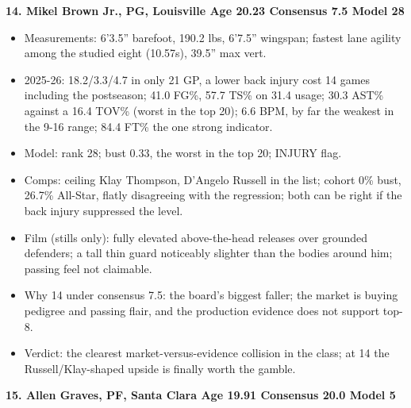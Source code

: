 \documentclass[
  10pt,
]{article}
\providecommand{\tightlist}{%
  \setlength{\itemsep}{0pt}\setlength{\parskip}{0pt}}
\begin{document}
\textbf{14. Mikel Brown Jr., PG, Louisville \textbar{} Age 20.23 \textbar{}
Consensus 7.5 \textbar{} Model 28}

\begin{itemize}
\tightlist
\item
  Measurements: 6'3.5'' barefoot, 190.2 lbs, 6'7.5'' wingspan; fastest lane
  agility among the studied eight (10.57s), 39.5'' max vert.
\item
  2025-26: 18.2/3.3/4.7 in only 21 GP, a lower back injury cost 14 games
  including the postseason; 41.0 FG\%, 57.7 TS\% on 31.4 usage; 30.3 AST\%
  against a 16.4 TOV\% (worst in the top 20); 6.6 BPM, by far the weakest in the
  9-16 range; 84.4 FT\% the one strong indicator.
\item
  Model: rank 28; bust 0.33, the worst in the top 20; INJURY flag.
\item
  Comps: ceiling Klay Thompson, D'Angelo Russell in the list; cohort 0\% bust,
  26.7\% All-Star, flatly disagreeing with the regression; both can be right if
  the back injury suppressed the level.
\item
  Film (stills only): fully elevated above-the-head releases over grounded
  defenders; a tall thin guard noticeably slighter than the bodies around him;
  passing feel not claimable.
\item
  Why 14 under consensus 7.5: the board's biggest faller; the market is buying
  pedigree and passing flair, and the production evidence does not support
  top-8.
\item
  Verdict: the clearest market-versus-evidence collision in the class; at 14 the
  Russell/Klay-shaped upside is finally worth the gamble.
\end{itemize}

\textbf{15. Allen Graves, PF, Santa Clara \textbar{} Age 19.91 \textbar{}
Consensus 20.0 \textbar{} Model 5}
\end{document}
